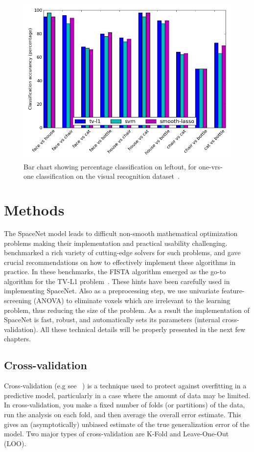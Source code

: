 \begin{figure}[!htbp]
  \includegraphics[width=1\linewidth]{figures/haxby_barchart.png}
  \caption{Bar chart showing percentage classification on leftout, for one-vrs-one classification on the visual recognition dataset~\citep{haxby2001}.
  }
  \label{fig:spacenet_bars}
\end{figure}

\section{Methods}
The SpaceNet model leads to difficult non-smooth mathematical optimization problems making their implementation and practical usability challenging.~\citep{dohmatob2014benchmarking} benchmarked a rich variety of cutting-edge solvers for such problems, and gave crucial recommendations on how to effectively implement these algorithms in practice. In these benchmarks, the FISTA algorithm emerged as the go-to algorithm for the TV-L1 problem~\citep{dohmatob2015speeding}. These hints have been carefully used in implementing SpaceNet. Also as a preprocessing step, we use univariate feature-screening (ANOVA) to eliminate voxels which are irrelevant to the learning problem, thus reducing the size of the problem. As a result the implementation of SpaceNet is fast, robust, and automatically sets its parameters (internal cross-validation). All these technical details will be properly presented in the next few chapters.

\subsection{Cross-validation}
Cross-validation (e.g see ~\citep{stone74}) is a technique used to protect against overfitting in a predictive model, particularly in a case where the amount of data may be limited. In cross-validation, you make a fixed number of folds (or partitions) of the data, run the analysis on each fold, and then average the overall error estimate. This gives an (asymptotically) unbiased estimate of the true generalization error of the model. 
Two major types of cross-validation are K-Fold and Leave-One-Out (LOO).


